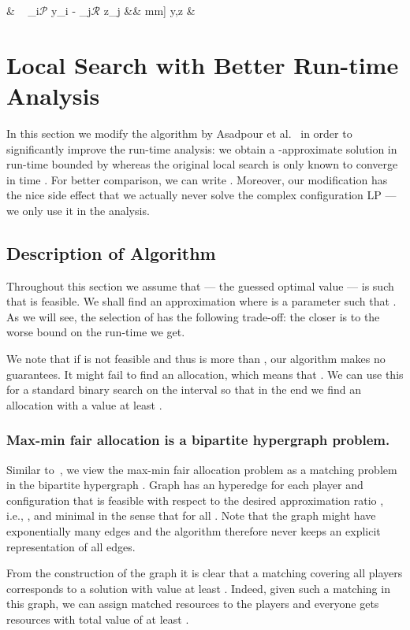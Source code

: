 \documentclass{llncs}
\newcommand{\res}{\ensuremath{\mathcal{R}}\xspace}
\newcommand{\players}{\ensuremath{\mathcal{P}}\xspace}
\begin{document}
            \max & \mbox{  } \sum_{i\in \players} y_i - \sum_{j\in \res} z_j  && \1mm]
            y,z & 
          
\section{Local Search with Better Run-time Analysis}

In this section we modify the algorithm by Asadpour et
al.~\cite{AFS08} in order to significantly improve the run-time
analysis: we obtain a -approximate solution in
run-time bounded by  whereas the original
local search is only known to converge in time . For better
comparison, we can write . Moreover, our modification has the nice side effect
that we actually never solve the complex configuration LP --- we only
use it in the analysis.

\subsection{Description of Algorithm}
\label{sec:algodesc}
Throughout this section we assume that  --- the guessed optimal value --- is such that  is feasible. We
shall find an  approximation where  is a parameter such that
. As we will see, the selection of  has the following
trade-off: the closer  is to  the worse bound on the run-time we get.

We note that if  is not feasible and thus  is more than ,
our algorithm makes no guarantees. It might fail to find an allocation, which
means that . We can use this for a standard binary search  on the
interval  so that in the end we find an
allocation with a value at least .

\subsubsection{Max-min fair allocation is a bipartite hypergraph problem.}
Similar to~\cite{AFS08}, we view the max-min fair allocation problem as a
matching problem in the bipartite hypergraph . Graph 
has an hyperedge  for each player  and
configuration  that is feasible with respect to the desired
approximation ratio , i.e., , and minimal in the
sense that  for all . Note that the graph
might have exponentially many edges and the algorithm therefore never keeps
an explicit representation of all edges.

From the construction of the graph it is clear that a matching covering all
players corresponds to a solution with value at least . Indeed, given
such a matching  in this graph, we can assign matched resources to the
players and everyone gets resources with total value of at least .
\end{document}
